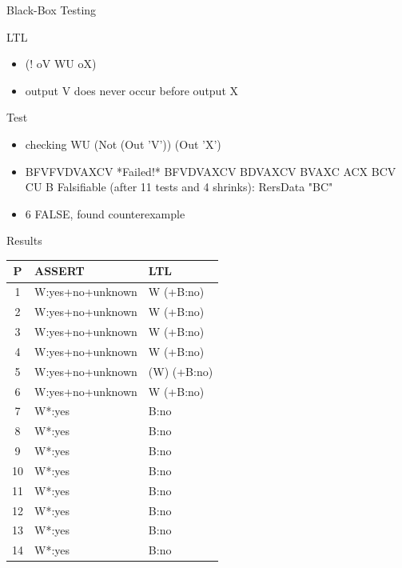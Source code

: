 

\begin{frame}{Black-Box Testing}
\begin{block}{LTL}
\begin{itemize}
\item (! oV WU oX)
\item output V does never occur before output X
\end{itemize}
\end{block}

\begin{block}{Test}
\begin{itemize}

\item checking WU (Not (Out 'V')) (Out 'X')
\item  BFVFVDVAXCV *Failed!* BFVDVAXCV BDVAXCV BVAXC ACX BCV CU B Falsifiable (after 11 tests and 4 shrinks):  RersData "BC"
\item 6 FALSE, found counterexample
\end{itemize}
\end{block}

\end{frame}


\begin{frame}{Results}
\begin{center}
\vspace{-0.2cm}
\begin{tabular}{|c|l|l|}\hline
P & ASSERT & LTL \\\hline\hline
1 & W:yes+no+unknown      & W (+B:no)\\\hline
2 & W:yes+no+unknown     & W (+B:no)\\\hline
3 & W:yes+no+unknown     & W (+B:no)\\\hline
4 & W:yes+no+unknown     & W (+B:no)\\\hline
5 & W:yes+no+unknown     & (W) (+B:no)\\\hline
6 & W:yes+no+unknown     & W (+B:no) \\\hline
7 & W*:yes     & B:no    \\\hline
8 & W*:yes     & B:no    \\\hline
9 & W*:yes     & B:no    \\\hline
10 & W*:yes     & B:no    \\\hline
11 & W*:yes     & B:no    \\\hline
12 & W*:yes     & B:no    \\\hline
13 & W*:yes     & B:no    \\\hline
14 & W*:yes     & B:no    \\\hline
\end{tabular}
\end{center}
\end{frame}

